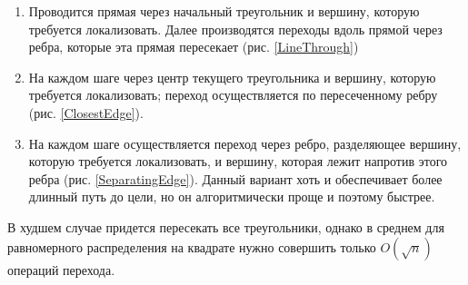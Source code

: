 \documentclass{fefu}
\begin{document}
\begin{enumerate}[label=\alph*]
    \item Проводится прямая через начальный треугольник и вершину, которую требуется локализовать. Далее производятся
    переходы вдоль прямой через ребра, которые эта прямая пересекает (рис. \ref{LineThrough})
    \item На каждом шаге через центр текущего треугольника и вершину, которую требуется локализовать;
    переход осуществляется по пересеченному ребру (рис. \ref{ClosestEdge}).
    \item На каждом шаге осуществляется переход через ребро, разделяющее вершину, которую требуется локализовать, и
    вершину, которая лежит напротив этого ребра (рис. \ref{SeparatingEdge}). Данный вариант хоть и обеспечивает более
    длинный путь до цели, но он алгоритмически проще и поэтому быстрее.
\end{enumerate}

В худшем случае придется пересекать все треугольники, однако в среднем для равномерного распределения на квадрате нужно
совершить только $O(\sqrt{n})$ операций перехода\cite{Shapiro}.
\end{document}
